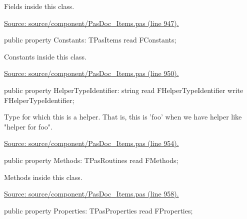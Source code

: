\documentclass{report}
\newif\ifpdf
\begin{document}
\begin{list}{}
\begin{flushleft}
\ifpdf
\end{flushleft}
\fi


\par Fields inside this class.\par
\href{https://github.com/pasdoc/pasdoc/blob/master/source/component/PasDoc_Items.pas#L947}{Source: source/component/PasDoc{\_}Items.pas (line 947).}\label{PasDoc_Items.TPasCio-Constants}
\item[\textbf{Constants}\hfill]
\ifpdf
\begin{flushleft}
\fi
\begin{ttfamily}
public property Constants: TPasItems read FConstants;\end{ttfamily}

\ifpdf
\end{flushleft}
\fi


\par Constants inside this class.\par
\href{https://github.com/pasdoc/pasdoc/blob/master/source/component/PasDoc_Items.pas#L950}{Source: source/component/PasDoc{\_}Items.pas (line 950).}\label{PasDoc_Items.TPasCio-HelperTypeIdentifier}
\item[\textbf{HelperTypeIdentifier}\hfill]
\ifpdf
\begin{flushleft}
\fi
\begin{ttfamily}
public property HelperTypeIdentifier: string
      read FHelperTypeIdentifier write FHelperTypeIdentifier;\end{ttfamily}

\ifpdf
\end{flushleft}
\fi


\par Type for which this is a helper. That is, this is 'foo' when we have helper like "helper for foo".\par
\href{https://github.com/pasdoc/pasdoc/blob/master/source/component/PasDoc_Items.pas#L954}{Source: source/component/PasDoc{\_}Items.pas (line 954).}\label{PasDoc_Items.TPasCio-Methods}
\item[\textbf{Methods}\hfill]
\ifpdf
\begin{flushleft}
\fi
\begin{ttfamily}
public property Methods: TPasRoutines read FMethods;\end{ttfamily}

\ifpdf
\end{flushleft}
\fi


\par Methods inside this class.\par
\href{https://github.com/pasdoc/pasdoc/blob/master/source/component/PasDoc_Items.pas#L958}{Source: source/component/PasDoc{\_}Items.pas (line 958).}\label{PasDoc_Items.TPasCio-Properties}
\item[\textbf{Properties}\hfill]
\ifpdf
\begin{flushleft}
\fi
\begin{ttfamily}
public property Properties: TPasProperties read FProperties;\end{ttfamily}


\end{flushleft}
\end{list}
\end{document}
